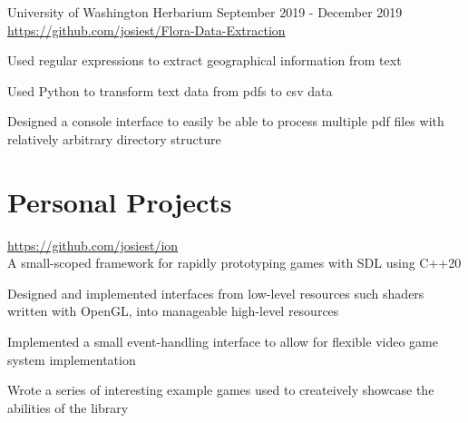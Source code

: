 \documentclass[10pt]{article}
\newenvironment{itemize*}
{\begin{itemize}[leftmargin=*]
    \setlength{\parskip}{0.5pt}}
{\end{itemize}}
\begin{document}
\begin{description}[leftmargin=!,
                    labelwidth=\widthof{\bfseries Lab Assistant}]
\item[Lab Assistant]
    University of Washington Herbarium \hfill September 2019 - December 2019\\
    \url{https://github.com/josiest/Flora-Data-Extraction}
    
\end{description}
\begin{itemize*}
\item Used regular expressions to extract geographical information from text
\item Used Python to transform text data from pdfs to csv data
\item Designed a console interface to easily be able to process multiple pdf
      files with relatively arbitrary directory structure
\end{itemize*}

\section*{Personal Projects}
\begin{description}[leftmargin=!,labelwidth=\widthof{\bfseries ion library}]
\item[ion library] \url{https://github.com/josiest/ion}\\
    A small-scoped framework for rapidly prototyping games with SDL using C++20
\end{description}
\begin{itemize*}
\item Designed and implemented interfaces from low-level resources such shaders
      written with OpenGL, into manageable high-level resources
\item Implemented a small event-handling interface to allow for flexible
      video game system implementation
\item Wrote a series of interesting example games used to createively showcase
      the abilities of the library
\vspace{10pt}
\end{itemize*}
\end{document}
